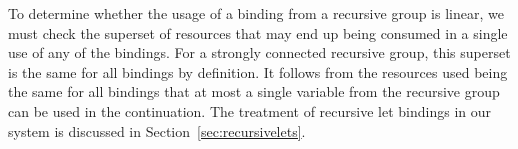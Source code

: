 \documentclass[acmsmall,review,screen]{acmart}
\newcommand{\incode}[1]{\lstinline{#1}}
\newcommand{\lolli}{\multimap}
\newcommand{\ROUNDTWO}[1]{{\color{red}#1}}
\begin{document}
%

To determine whether the usage of a binding from a recursive group is linear,
we must \ROUNDTWO{check} the superset of resources that may end up being consumed in a
single use of any of the bindings. For a strongly connected recursive group,
this superset is the same for all bindings by definition.
%
%
It follows from the resources used being the same for all bindings
that at most a single variable from the recursive group can be used in the
continuation.
%
The treatment of recursive let bindings in our system is discussed in Section~\ref{sec:recursivelets}.

\end{document}

